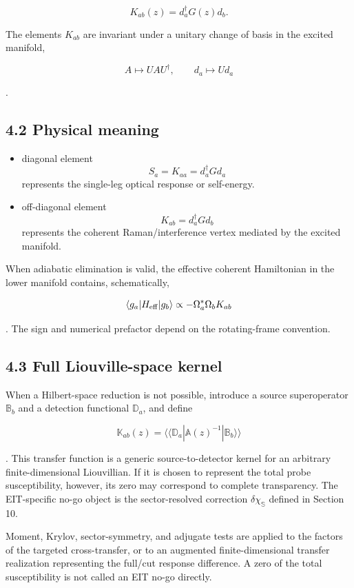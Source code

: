 \documentclass[
  10pt,
  a4paper,
]{article}
\providecommand{\tightlist}{%
  \setlength{\itemsep}{0pt}\setlength{\parskip}{0pt}}
\begin{document}
\[
K_{ab}(z)=d_a^\dagger G(z)d_b.
\]

The elements \(K_{ab}\) are invariant under a unitary change of basis in
the excited manifold,

\[
A\mapsto UAU^\dagger,
\qquad
d_a\mapsto Ud_a
\]

.

\subsection{4.2 Physical meaning}\label{physical-meaning}

\begin{itemize}
\tightlist
\item
  diagonal element \[
  S_a=K_{aa}=d_a^\dagger Gd_a
  \] represents the single-leg optical response or self-energy.
\item
  off-diagonal element \[
  K_{ab}=d_a^\dagger Gd_b
  \] represents the coherent Raman/interference vertex mediated by the
  excited manifold.
\end{itemize}

When adiabatic elimination is valid, the effective coherent Hamiltonian
in the lower manifold contains, schematically,

\[
\langle g_a|H_{\rm eff}|g_b\rangle
\propto-\Omega_a^*\Omega_bK_{ab}
\]

. The sign and numerical prefactor depend on the rotating-frame
convention.

\subsection{4.3 Full Liouville-space
kernel}\label{full-liouville-space-kernel}

When a Hilbert-space reduction is not possible, introduce a source
superoperator \(\mathbb B_b\) and a detection functional
\(\mathbb D_a\), and define

\[
\boxed{
\mathbb K_{ab}(z)
=\langle\!\langle \mathbb D_a|
\mathbb A(z)^{-1}
|\mathbb B_b\rangle\!\rangle
}
\]

. This transfer function is a generic source-to-detector kernel for an
arbitrary finite-dimensional Liouvillian. If it is chosen to represent
the total probe susceptibility, however, its zero may correspond to
complete transparency. The EIT-specific no-go object is the
sector-resolved correction \(\delta\chi_{\mathbb S}\) defined in Section
10.

Moment, Krylov, sector-symmetry, and adjugate tests are applied to the
factors of the targeted cross-transfer, or to an augmented
finite-dimensional transfer realization representing the full/cut
response difference. A zero of the total susceptibility is not called an
EIT no-go directly.
\end{document}
